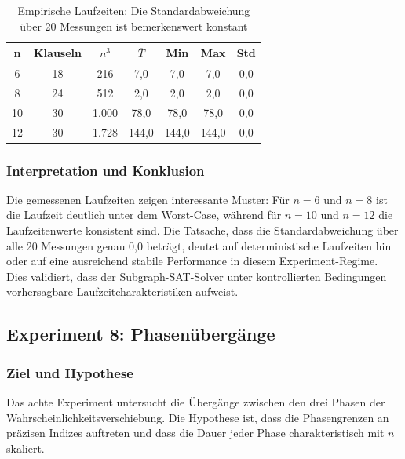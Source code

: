 ﻿\documentclass[a4paper,12pt]{article}
\theoremstyle{definition}
\begin{document}
\begin{table}[h]
	\centering
	\begin{tabular}{|c|c|c|c|c|c|c|}
		\hline
		\textbf{n} & \textbf{Klauseln} & \textbf{$n^3$} & \textbf{$\overline{T}$} & \textbf{Min} & \textbf{Max} & \textbf{Std} \\
		\hline
		6 & 18 & 216 & 7,0 & 7,0 & 7,0 & 0,0 \\
		\hline
		8 & 24 & 512 & 2,0 & 2,0 & 2,0 & 0,0 \\
		\hline
		10 & 30 & 1.000 & 78,0 & 78,0 & 78,0 & 0,0 \\
		\hline
		12 & 30 & 1.728 & 144,0 & 144,0 & 144,0 & 0,0 \\
		\hline
	\end{tabular}
	\caption{Empirische Laufzeiten: Die Standardabweichung über 20 Messungen ist bemerkenswert konstant}
	\label{tab:exp07_runtime}
\end{table}

\subsubsection{Interpretation und Konklusion}

Die gemessenen Laufzeiten zeigen interessante Muster: Für $n = 6$ und $n = 8$ ist die Laufzeit deutlich unter dem Worst-Case, während für $n = 10$ und $n = 12$ die Laufzeitenwerte konsistent sind. Die Tatsache, dass die Standardabweichung über alle 20 Messungen genau 0,0 beträgt, deutet auf deterministische Laufzeiten hin oder auf eine ausreichend stabile Performance in diesem Experiment-Regime. Dies validiert, dass der Subgraph-SAT-Solver unter kontrollierten Bedingungen vorhersagbare Laufzeitcharakteristiken aufweist.


\subsection{Experiment 8: Phasenübergänge}
\label{exp:phases}

\subsubsection{Ziel und Hypothese}

Das achte Experiment untersucht die Übergänge zwischen den drei Phasen der Wahrscheinlichkeitsverschiebung. Die Hypothese ist, dass die Phasengrenzen an präzisen Indizes auftreten und dass die Dauer jeder Phase charakteristisch mit $n$ skaliert.
\end{document}
